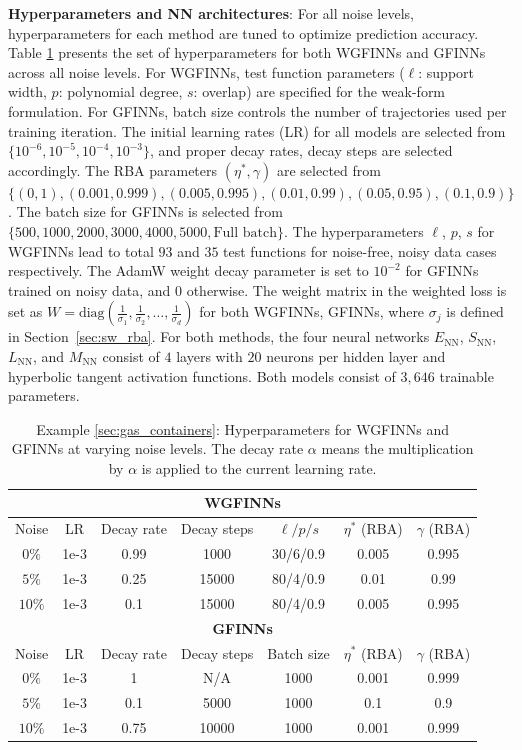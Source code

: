 \documentclass[final]{siamltex}
\begin{document}
\begin{appendices}
{\bf Hyperparameters and NN architectures}: 
For all noise levels, hyperparameters for each method are tuned to optimize prediction accuracy. 
Table \ref{tab:Hyperparameters_GC} presents the set of hyperparameters for both WGFINNs and GFINNs across all noise levels. For WGFINNs, test function parameters ($\ell$: support width, $p$: polynomial degree, $s$: overlap) are specified for the weak-form formulation. For GFINNs, batch size controls the number of trajectories used per training iteration. 
The initial learning rates (LR) for all models are selected from $\{10^{-6}, 10^{-5}, 10^{-4} , 10^{-3}\}$, and proper decay rates, decay steps are selected accordingly. 
The RBA parameters $(\eta^*, \gamma)$ are selected from $\{ (0 , 1), (0.001 , 0.999), (0.005 , 0.995), (0.01 , 0.99), (0.05 , 0.95), (0.1, 0.9)\}$. The batch size for GFINNs is selected from $\{500, 1000, 2000, 3000, 4000, 5000, \text{Full batch}\}$. The hyperparameters $\ell$, $p$, $s$ for WGFINNs lead to total $93$ and $35$ test functions for noise-free, noisy data cases respectively. 
The AdamW weight decay parameter is set to $10^{-2}$ for GFINNs trained on noisy data, and $0$ otherwise.
The weight matrix in the weighted loss is set as $W = \text{diag}(\frac{1}{\sigma_1}, \frac{1}{\sigma_2}, \ldots, \frac{1}{\sigma_d})$ for both WGFINNs, GFINNs, where $\sigma_j$ is defined in Section~\ref{sec:sw_rba}. 
For both methods, the four neural networks $E_{\text{NN}}$, $S_{\text{NN}}$, $L_{\text{NN}}$, and $M_{\text{NN}}$ consist of $4$ layers with $20$ neurons per hidden layer and hyperbolic tangent activation functions. Both models consist of \(3{,}646\) trainable parameters.

\begin{table}[!t]
\centering
\begin{tabular}{|c||c|c|c|c|c|c|}
\hline
\multicolumn{7}{|c|}{\textbf{WGFINNs}} \\
\hline
Noise  & LR & Decay rate & Decay steps & $\ell/p/s$ & $\eta^*$ (RBA) & $\gamma$ (RBA) \\
\hline
$0\%$ & 1e-3   & 0.99 & 1000 & 30/6/0.9  & 0.005 & 0.995 \\
\hline
$5\%$ & 1e-3  & 0.25  & 15000 & 80/4/0.9 & 0.01  & 0.99 \\
\hline
$10\%$ & 1e-3  & 0.1 & 15000 & 80/4/0.9 & 0.005 & 0.995 \\
\hline\hline
\multicolumn{7}{|c|}{\textbf{GFINNs}} \\
\hline
Noise& LR & Decay rate & Decay steps & Batch size & $\eta^*$ (RBA) & $\gamma$ (RBA) \\
\hline
$0\%$ & 1e-3 & 1 & N/A & 1000 & 0.001  & 0.999  \\
\hline
$5\%$ & 1e-3 & 0.1 & 5000 & 1000 & 0.1 & 0.9 \\
\hline
$10\%$ &  1e-3 & 0.75 & 10000 & 1000 & 0.001  & 0.999  \\
\hline
\end{tabular}
\caption{Example \ref{sec:gas_containers}: Hyperparameters for WGFINNs and GFINNs at varying noise levels. The decay rate $\alpha$ means the multiplication by $\alpha$ is applied to the current learning rate.}
\label{tab:Hyperparameters_GC}
\end{table}


\end{appendices}
\end{document}
